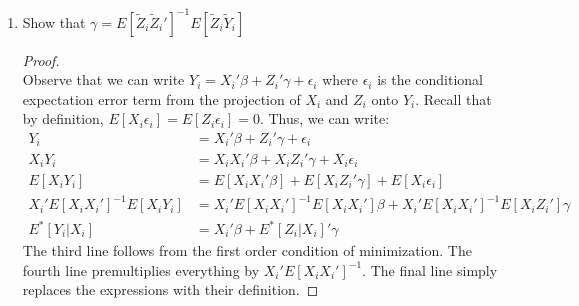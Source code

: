 \documentclass[11pt]{article}
\begin{document}
\begin{enumerate}[label = (\alph*)]
	\item Show that $\gamma = E\left[\tilde Z_i \tilde Z_i'\right]^{-1} E\left[\tilde Z_i \tilde Y_i\right]$
	\begin{proof}\mbox{}\\
		Observe that we can write $Y_i = X_i'\beta + Z_i'\gamma + \epsilon_i$ where $\epsilon_i$ is the conditional expectation error term from the projection of $X_i$ and $Z_i$ onto $Y_i$. Recall that by definition, $E[X_i \epsilon_i] = E[Z_i \epsilon_i] = 0$. Thus, we can write:
		\begin{align*}
			Y_i & = X_i'\beta + Z_i'\gamma + \epsilon_i \\
			X_i Y_i & = X_i X_i'\beta + X_i Z_i'\gamma + X_i \epsilon_i \\
			E[X_i Y_i] & = E[X_i X_i'\beta] + E[X_i Z_i'\gamma] + E[X_i \epsilon_i]\\
			X_i'E[X_iX_i']^{-1}E[X_i Y_i] & = X_i'E[X_iX_i']^{-1}E[X_i X_i']\beta + X_i'E[X_iX_i']^{-1}E[X_i Z_i']\gamma \\
			E^*[Y_i|X_i] & = X_i'\beta + E^*[Z_i|X_i]'\gamma
		\end{align*}
		The third line follows from the first order condition of minimization. The fourth line premultiplies everything by $X_i'E[X_iX_i']^{-1}$. The final line simply replaces the expressions with their definition.


\end{proof}
\end{enumerate}
\end{document}

